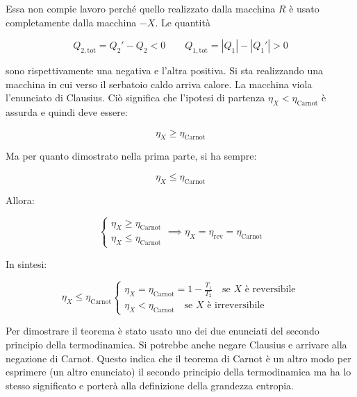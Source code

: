 \begin{figure}[htpb]
\end{figure}
\FloatBarrier
Essa non compie lavoro perché quello realizzato dalla macchina $R$ è usato completamente dalla macchina $-X$. Le quantità

\[
	Q_{2,\text{tot} } = Q_2' - Q_2 < 0 \qquad Q_{1,\text{tot} } = |Q_1| - |Q_1'| > 0
\]

sono rispettivamente una negativa e l'altra positiva. Si sta realizzando una macchina in cui verso il serbatoio caldo arriva calore. La macchina viola l'enunciato di Clausius. Ciò significa che l'ipotesi di partenza $\eta_X< \eta_{\text{Carnot}}$ è assurda e quindi deve essere:

\[
	\eta_X \geq \eta_{\text{Carnot}}
\]

Ma per quanto dimostrato nella prima parte, si ha sempre:

\[
	\eta_X \leq \eta_{\text{Carnot}}
\]

Allora:

\[
	\left\{ \begin{array}{r}
	 	\eta_X \geq \eta_{\text{Carnot}} \\
		\eta_X \leq \eta_{\text{Carnot}}
	\end{array} \right.
	\implies \boxed{\eta_X = \eta_{\text{rev}} = \eta_{\text{Carnot}}}
\]

In sintesi:

\[
	\boxed{\eta_X \le \eta_{\text{Carnot} }\left\{ \begin{array}{l}
	 	\eta_X = \eta_{\text{Carnot} } = 1 - \frac{T_1 }{T_2 }\quad \text{se }X\text{ è reversibile} \\
		\eta_X < \eta_{\text{Carnot} } \quad \text{se }X\text{ è irreversibile}
	\end{array} \right.}
\]

Per dimostrare il teorema è stato usato uno dei due enunciati del secondo principio della termodinamica. Si potrebbe anche negare Clausius e arrivare alla negazione di Carnot. Questo indica che il teorema di Carnot è un altro modo per esprimere (un altro enunciato) il secondo principio della termodinamica ma ha lo stesso significato e porterà alla definizione della grandezza entropia.

